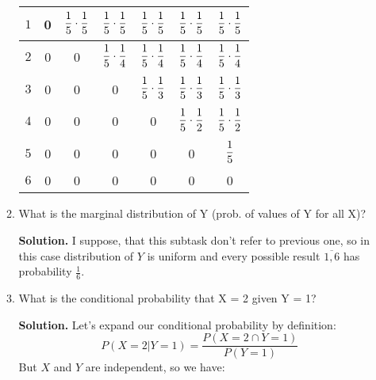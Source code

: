\documentclass[a4paper, 12pt]{article}
\newcommand{\fract}[2]{\dfrac{\mathstrut #1}{\mathstrut #2}}
\newcommand{\task}[2]{
    \item #1
    \begin{mdframed} \textbf{Solution. } #2 \end{mdframed}
}
\begin{document}
\begin{enumerate}
\begin{enumerate}
{\begin{center}
\begin{tabular}{|c|c|c|c|c|c|c|}
                          \hline
                          $1$     & 0   & $\fract{1}{5} \cdot \fract{1}{5}$ & $\fract{1}{5} \cdot \fract{1}{5}$ & $\fract{1}{5} \cdot \fract{1}{5}$ & $\fract{1}{5} \cdot \fract{1}{5}$ & $\fract{1}{5} \cdot \fract{1}{5}$ \\
                          \hline
                          $2$     & 0   & 0                                 & $\fract{1}{5} \cdot \fract{1}{4}$ & $\fract{1}{5} \cdot \fract{1}{4}$ & $\fract{1}{5} \cdot \fract{1}{4}$ & $\fract{1}{5} \cdot \fract{1}{4}$ \\
                          \hline
                          $3$     & 0   & 0                                 & 0                                 & $\fract{1}{5} \cdot \fract{1}{3}$ & $\fract{1}{5} \cdot \fract{1}{3}$ & $\fract{1}{5} \cdot \fract{1}{3}$ \\
                          \hline
                          $4$     & 0   & 0                                 & 0                                 & 0                                 & $\fract{1}{5} \cdot \fract{1}{2}$ & $\fract{1}{5} \cdot \fract{1}{2}$ \\
                          \hline
                          $5$     & 0   & 0                                 & 0                                 & 0                                 & 0                                 & $\fract{1}{5}$                    \\
                          \hline
                          $6$     & 0   & 0                                 & 0                                 & 0                                 & 0                                 & 0                                 \\
                          \hline
                      \end{tabular}
                  \end{center}
              }
              \task{What is the marginal distribution of Y (prob. of values of Y for all X)?}
              {I suppose, that this subtask don't refer to previous one, so in this case distribution of $Y$ is
                  uniform and every possible result $\overline{1, 6}$ has probability $\frac{1}{6}$.}
              \task{What is the conditional probability that X = 2 given Y = 1?}
              {
                  Let's expand our conditional probability by definition:
                  \[
                      P(X=2 | Y=1) = \frac{P(X=2 \cap Y=1)}{P(Y=1)}
                  \]
                  But $X$ and $Y$ are independent, so we have:
}
\end{enumerate}
\end{enumerate}
\end{document}
